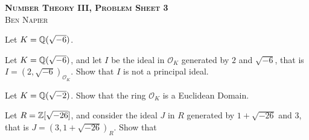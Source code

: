 \documentclass[a4paper, answers]{exam}
\begin{document}
\begin{center}
	\textbf{\textsc{Number Theory III, Problem Sheet 3}} \\
	\textsc{Ben Napier}
	\vspace{1em}
\end{center}

\begin{questions}
	\question 

	\question
	Let $K = \mathbb{Q}(\sqrt{-6})$.

	\question
	Let $K = \mathbb{Q}(\sqrt{-6})$, and let $I$ be the ideal in $\mathcal O_K$
	generated by $2$ and $\sqrt{-6}$, that is 
	$I = (2, \sqrt{-6})_{\mathcal O_K}$.
	Show that $I$ is not a principal ideal.

	\question
	Let $K = \mathbb{Q}(\sqrt{-2})$.
	Show that the ring $\mathcal O_K$ is a Euclidean Domain.

	\question
	Let $R = \mathbb{Z}[\sqrt{-26}]$, and consider the ideal $J$ in $R$ generated by
	$1 + \sqrt{-26}$ and $3$, that is $J = (3, 1 + \sqrt{-26})_R$.
	Show that
\end{questions}
\end{document}
